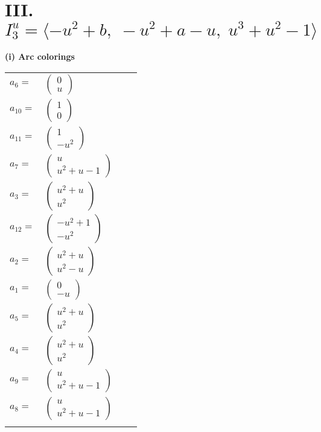 \documentclass[1p]{elsarticle_modified}
\theoremstyle{definition}
\begin{document}
\centering \section*{III. $I^u_{3}= \langle - u^2+b,\;- u^2+a- u,\;u^3+u^2-1 \rangle$}
\flushleft \textbf{(i) Arc colorings}\\
\begin{tabular}{m{7pt} m{180pt} m{7pt} m{180pt} }
\flushright $a_{6}=$&$\begin{pmatrix}0\\u\end{pmatrix}$ \\
\flushright $a_{10}=$&$\begin{pmatrix}1\\0\end{pmatrix}$ \\
\flushright $a_{11}=$&$\begin{pmatrix}1\\- u^2\end{pmatrix}$ \\
\flushright $a_{7}=$&$\begin{pmatrix}u\\u^2+u-1\end{pmatrix}$ \\
\flushright $a_{3}=$&$\begin{pmatrix}u^2+u\\u^2\end{pmatrix}$ \\
\flushright $a_{12}=$&$\begin{pmatrix}- u^2+1\\- u^2\end{pmatrix}$ \\
\flushright $a_{2}=$&$\begin{pmatrix}u^2+u\\u^2- u\end{pmatrix}$ \\
\flushright $a_{1}=$&$\begin{pmatrix}0\\- u\end{pmatrix}$ \\
\flushright $a_{5}=$&$\begin{pmatrix}u^2+u\\u^2\end{pmatrix}$ \\
\flushright $a_{4}=$&$\begin{pmatrix}u^2+u\\u^2\end{pmatrix}$ \\
\flushright $a_{9}=$&$\begin{pmatrix}u\\u^2+u-1\end{pmatrix}$ \\
\flushright $a_{8}=$&$\begin{pmatrix}u\\u^2+u-1\end{pmatrix}$\\&\end{tabular}
\end{document}
